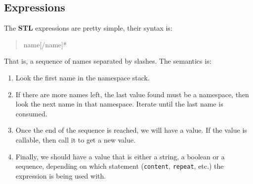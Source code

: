 \subsection{Expressions}

The {\bf STL} expressions are pretty simple, their syntax is:

\begin{quote}
    name[/name]*
\end{quote}

That is, a sequence of names separated by slashes. The semantics is:

\begin{enumerate}
  \item Look the first name in the namespace stack.

  \item If there are more names left, the last value found must be a namespace,
    then look the next name in that namespace. Iterate until the last name
    is consumed.

  \item Once the end of the sequence is reached, we will have a value. If
    the value is callable, then call it to get a new value.

  \item Finally, we should have a value that is either a string, a boolean
    or a sequence, depending on which statement ({\tt content}, {\tt repeat},
    etc.) the expression is being used with.
\end{enumerate}



